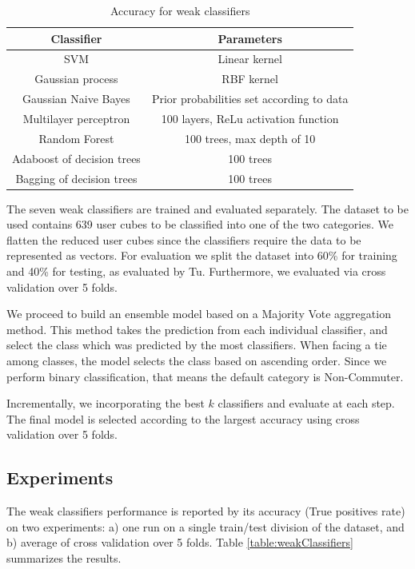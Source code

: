 \documentclass{article}
\begin{document}
\begin{table}[H]
\centering
\begin{tabular}{||c|c||}
\hline
\textbf{Classifier} & \textbf{Parameters} \\ [0.5ex] 
\hline \hline
SVM & Linear kernel \\
Gaussian process & RBF kernel\\
Gaussian Naive Bayes & Prior probabilities set according to data \\
Multilayer perceptron & 100 layers, ReLu activation function \\
Random Forest & 100 trees, max depth of 10 \\
Adaboost of decision trees & 100 trees \\
Bagging of decision trees & 100 trees\\ [1ex]
\hline 
\end{tabular}
\caption{Accuracy for weak classifiers}
\label{table:classifiersParam}
\end{table}

The seven weak classifiers are trained and evaluated separately. The dataset to be used contains 639 user cubes to be classified into one of the two categories. We flatten the reduced user cubes since the classifiers require the data to be represented as vectors. For evaluation we split the dataset into 60\% for training and 40\% for testing, as evaluated by Tu. Furthermore, we evaluated via cross validation over 5 folds.  

We proceed to build an ensemble model based on a Majority Vote aggregation method. This method takes the prediction from each individual classifier, and select the class which was predicted by the most classifiers. When facing a tie among classes, the model selects the class based on ascending order. Since we perform binary classification, that means the default category is Non-Commuter. 

Incrementally, we incorporating the best $k$ classifiers and evaluate at each step. The final model is selected according to the largest accuracy using cross validation over 5 folds. 

\subsection{Experiments}
The weak classifiers performance is reported by its accuracy (True positives rate) on two experiments: a) one run on a single train/test division of the dataset, and b) average of cross validation over 5 folds. Table \ref{table:weakClassifiers} summarizes the results. 
\end{document}
